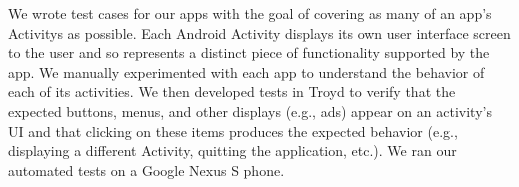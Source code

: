 \documentclass[preprint]{sig-alternate-10pt}
\newcommand{\code}[1]{\textsf{#1}}
\newcommand{\troyd}{Troyd\xspace}
\begin{document}



We wrote test cases for our apps with the goal of covering as many
of an app's \code{Activity}s as possible.  Each Android \code{Activity}
displays its own user interface screen to the user and so represents
a distinct piece of functionality supported by the app.  We manually
experimented with each app to understand the behavior of 
each of its activities.  We then developed tests in \troyd to 
verify that the expected buttons, menus, and other displays (e.g.,
ads) appear on an activity's UI and that clicking on these items produces
the expected behavior (e.g., displaying a different \code{Activity},
quitting the application, etc.). We ran our automated tests on a Google
Nexus S phone.

\end{document}
